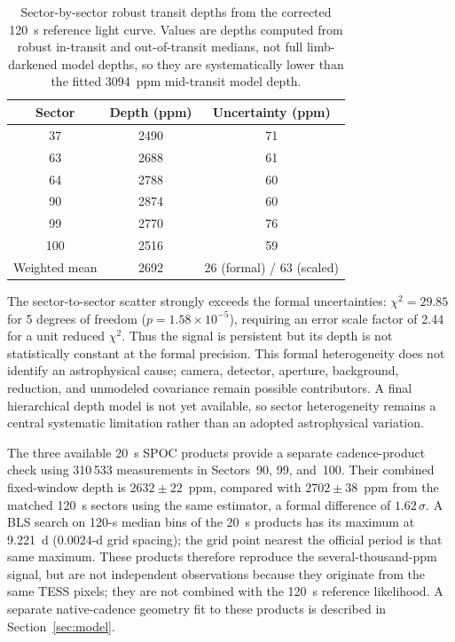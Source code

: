 \documentclass[11pt]{article}
\begin{document}
\begin{table}[ht]
\centering
\caption{Sector-by-sector robust transit depths from the corrected 120~s
  reference light curve.  Values are depths computed from robust in-transit
  and out-of-transit medians,
  not full limb-darkened model depths, so they are systematically lower
  than the fitted 3094~ppm mid-transit model depth.}
\label{tab:sectors}
\begin{tabular}{ccc}
\toprule
Sector & Depth (ppm) & Uncertainty (ppm) \\
\midrule
37  & 2490 & 71 \\
63  & 2688 & 61 \\
64  & 2788 & 60 \\
90  & 2874 & 60 \\
99  & 2770 & 76 \\
100 & 2516 & 59 \\
\midrule
Weighted mean & 2692 & 26 (formal) / 63 (scaled) \\
\bottomrule
\end{tabular}
\end{table}

The sector-to-sector scatter strongly exceeds the formal uncertainties:
$\chi^2=29.85$ for 5 degrees of freedom ($p=1.58\times10^{-5}$), requiring an
error scale factor of 2.44 for a unit reduced $\chi^2$.  Thus the signal is
persistent but its depth is not statistically constant at the formal
precision.  This formal heterogeneity does not identify an astrophysical
cause; camera, detector, aperture, background, reduction, and unmodeled
covariance remain possible contributors.  A final hierarchical depth model is
not yet available, so sector heterogeneity remains a central systematic
limitation rather than an adopted astrophysical variation.

The three available 20~s SPOC products provide a separate cadence-product
check using 310\,533 measurements in Sectors~90, 99, and~100.  Their combined
fixed-window depth is $2632\pm22$~ppm, compared with $2702\pm38$~ppm from the
matched 120~s sectors using the same estimator, a formal difference of
$1.62\,\sigma$.  A BLS search on 120-s median bins of the 20~s products has
its maximum at 9.221~d (0.0024-d grid spacing); the grid point nearest the
official period is that same maximum.  These products
therefore reproduce the several-thousand-ppm signal, but are not independent
observations because they originate from the same TESS pixels; they are not
combined with the 120~s reference likelihood.
A separate native-cadence geometry fit to these products is described in
Section~\ref{sec:model}.
\end{document}
